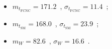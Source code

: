 \begin{itemize}
	\item $m_{t_{\mathrm{FCNC}}}=171.2$~\GeV,  $\sigma_{t_{\mathrm{FCNC}}}=11.4$~\GeV;
	\item $m_{t_{\mathrm{SM}}}=168.0$~\GeV,  $\sigma_{t_{\mathrm{SM}}}=23.9$~\GeV;
	\item $m_W=82.6$~\GeV,  $\sigma_W=16.6$~\GeV.
\end{itemize}	

